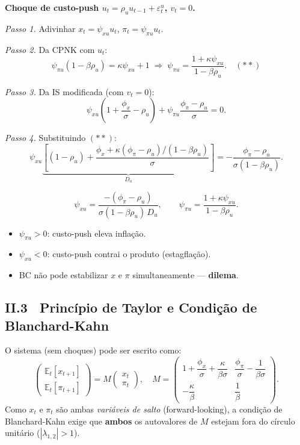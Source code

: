 \documentclass[12pt, a4paper]{article}
\newcommand{\E}{\mathbb{E}}
\begin{document}
\textbf{Choque de custo-push $u_t = \rho_u u_{t-1} + \varepsilon_t^u$, $v_t=0$.}

\textit{Passo 1.} Adivinhar $x_t = \psi_{xu}u_t$, $\pi_t = \psi_{\pi u}u_t$.

\textit{Passo 2.} Da CPNK com $u_t$:
\[
\psi_{\pi u}(1-\beta\rho_u) = \kappa\psi_{xu} + 1
\;\Rightarrow\;
\psi_{\pi u} = \frac{1+\kappa\psi_{xu}}{1-\beta\rho_u}. \quad (**)
\]

\textit{Passo 3.} Da IS modificada (com $v_t=0$):
\[
\psi_{xu}\!\left(1 + \frac{\phi_x}{\sigma} - \rho_u\right)
+ \psi_{\pi u}\!\frac{\phi_\pi - \rho_u}{\sigma} = 0.
\]

\textit{Passo 4.} Substituindo $(**)$:
\[
\psi_{xu}\!\underbrace{\left[(1-\rho_u)
  + \frac{\phi_x + \kappa(\phi_\pi-\rho_u)/(1-\beta\rho_u)}{\sigma}\right]}_{D_u}
= -\frac{\phi_\pi-\rho_u}{\sigma(1-\beta\rho_u)}.
\]

\begin{formulabox}[title={Solução para choque de custo-push $u_t$}]
\[
\boxed{
\psi_{xu} = \frac{-(\phi_\pi-\rho_u)}{\sigma(1-\beta\rho_u)\,D_u},\qquad
\psi_{\pi u} = \frac{1+\kappa\psi_{xu}}{1-\beta\rho_u}.
}
\]
\begin{itemize}[leftmargin=1.5em, itemsep=2pt]
  \item $\psi_{\pi u} > 0$: custo-push eleva inflação.
  \item $\psi_{xu} < 0$: custo-push contrai o produto (estagflação).
  \item BC não pode estabilizar $x$ e $\pi$ simultaneamente --- \textbf{dilema}.
\end{itemize}
\end{formulabox}

\subsection*{II.3 \ Princípio de Taylor e Condição de Blanchard-Kahn}

O sistema (sem choques) pode ser escrito como:
\[
\begin{pmatrix}\E_t[x_{t+1}]\\\E_t[\pi_{t+1}]\end{pmatrix}
= M\begin{pmatrix}x_t\\\pi_t\end{pmatrix},
\quad
M = \begin{pmatrix}
  1 + \dfrac{\phi_x}{\sigma} + \dfrac{\kappa}{\beta\sigma} &
  \dfrac{\phi_\pi}{\sigma} - \dfrac{1}{\beta\sigma} \\[8pt]
  -\dfrac{\kappa}{\beta} & \dfrac{1}{\beta}
\end{pmatrix}.
\]
Como $x_t$ e $\pi_t$ são ambas \emph{variáveis de salto} (forward-looking),
a condição de Blanchard-Kahn exige que \textbf{ambos} os autovalores de $M$
estejam fora do círculo unitário ($|\lambda_{1,2}|>1$).
\end{document}
